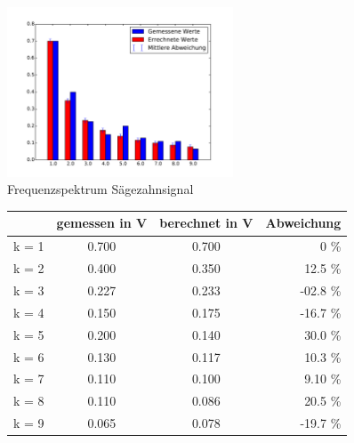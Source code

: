 \begin{figure}[h!]
	\centering
	\includegraphics[width=0.6\textwidth]{Saegezahn_Fourier.pdf}
	\caption{Frequenzspektrum Sägezahnsignal}
	\label{Fourier_Saege}
\end{figure}

\begin{figure}[h!]
	\centering
	\begin{tabular}{c|ccr}
		& gemessen in V & berechnet in V & Abweichung \\
		\hline
		 k = 1 & 0.700   & 0.700       &  0  \%       \\
		 k = 2 & 0.400   & 0.350      &  12.5 \%     \\
		 k = 3 & 0.227 & 0.233  & -02.8 \% \\
		 k = 4 & 0.150  & 0.175     & -16.7 \%  \\
		 k = 5 & 0.200   & 0.140      &  30.0 \%      \\
		 k = 6 & 0.130  & 0.117  &  10.3 \%  \\
		 k = 7 & 0.110  & 0.100       &  9.10 \% \\
		 k = 8 & 0.110  & 0.086    &  20.5 \%  \\
		 k = 9 & 0.065 & 0.078 & -19.7 \%  \\
	\end{tabular}
	\label{tab:Saege}
\end{figure}
\clearpage

